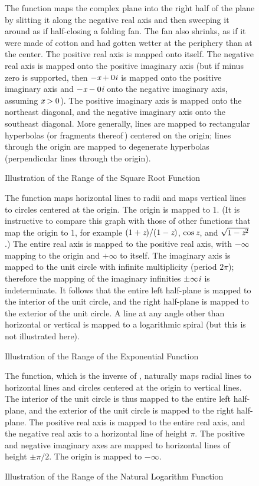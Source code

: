 \begin{figure}
\caption{Illustration of the Range of the Square Root Function}
\label{SECOND-PLOT}
\small\noindent
The  function maps the complex plane into the right half
of the plane by slitting it along the negative real axis and then sweeping
it around as if half-closing a folding fan.
The fan also shrinks, as if it were made of cotton and had gotten
wetter at the periphery than at the center.
The positive real axis is mapped onto itself.  The negative real axis is mapped
onto the positive imaginary axis (but if minus zero is supported, then
$-\emph{x}+0\emph{i}$ is mapped onto the positive imaginary axis and $-\emph{x}-0\emph{i}$ onto
the negative imaginary axis, assuming $\emph{x}>0$).  The positive imaginary axis
is mapped onto the northeast diagonal, and the negative imaginary axis
onto the southeast diagonal.  More generally, lines are mapped to rectangular hyperbolas
(or fragments thereof\,) centered on the origin;
lines through the origin are mapped to degenerate
hyperbolas (perpendicular lines through the origin).
\end{figure}

\clearpage

\begin{figure}
\caption{Illustration of the Range of the Exponential Function}
\small\noindent
The  function maps horizontal lines to radii and maps vertical
lines to circles centered at the origin.
The origin is mapped to 1.  (It is instructive to compare
this graph with those of other functions
that map the origin to 1, for example $(1+\emph{z})/(1-\emph{z})$, $\cos \emph{z}$, and $\sqrt{1-\emph{z}^2}$.)
The entire real axis is mapped to the positive
real axis, with $-\infty$ mapping to the origin and $+\infty$ to itself.
The imaginary axis is mapped to the unit circle with infinite multiplicity (period $2\pi$);
therefore the mapping of the imaginary infinities $\pm\infty \emph{i}$ is indeterminate.
It follows that the entire left half-plane is mapped to the interior of the unit circle,
and the right half-plane is mapped to the exterior of the unit circle.
A line at any angle other than horizontal or vertical is mapped to a
logarithmic spiral (but this is not illustrated here).
\end{figure}

\clearpage

\begin{figure}
\caption{Illustration of the Range of the Natural Logarithm Function}
\small\noindent
The  function, which is the inverse of , naturally maps radial lines to
horizontal lines and circles centered at the origin to vertical lines.
The interior of the unit circle is thus mapped to the entire left half-plane,
and the exterior of the unit circle is mapped to the right half-plane.
The positive real axis is mapped to the entire real axis, and the negative
real axis to a horizontal line of height $\pi$.  The positive and negative
imaginary axes are mapped to horizontal lines of height $\pm\pi/2$.
The origin is mapped to $-\infty$.
\end{figure}

